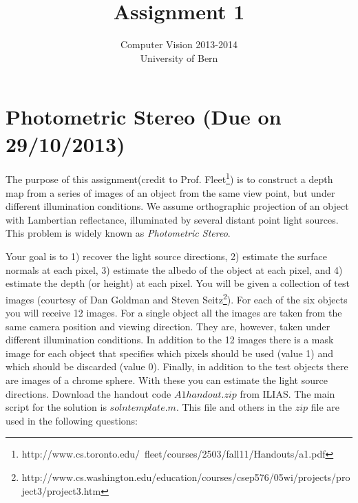 \documentclass{paper}
\title{Assignment 1}
\author{Computer Vision 2013-2014\\University of Bern}
\begin{document}
\maketitle

%

\section{Photometric Stereo (Due on 29/10/2013)}

The purpose of this assignment(credit to Prof. Fleet\footnote{http://www.cs.toronto.edu/~fleet/courses/2503/fall11/Handouts/a1.pdf}) is to construct a depth map from a series of images of an object from the same view point, but under different illumination conditions. We assume orthographic projection of an object with Lambertian reflectance, illuminated by several distant point light sources. This problem is widely known as \textit{Photometric Stereo}.

Your goal is to 1) recover the light source directions, 2) estimate the surface normals at each pixel, 3) estimate the albedo of the object at each pixel, and 4) estimate the depth (or height) at each pixel. You will be given a collection of test images (courtesy of Dan Goldman and Steven Seitz\footnote{http://www.cs.washington.edu/education/courses/csep576/05wi\newline/projects/project3/project3.htm}). For each of the six objects you will receive 12 images. For a single object all the images are taken from the same camera position and viewing direction. They are, however, taken under different illumination conditions. In addition to the 12 images there is a mask image for each object that specifies which pixels should be used (value 1) and which should be discarded (value 0). Finally, in addition to the test objects there are images of a chrome sphere. With these you can estimate the light source directions. Download the handout code $A1handout.zip$ from ILIAS. The main script for the solution is $solntemplate.m$. This file and others in the $zip$ file are used in the following questions:
\end{document}
